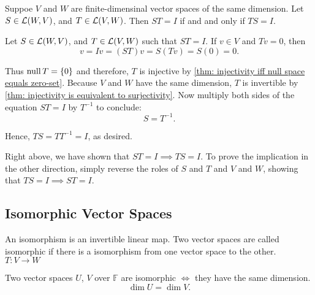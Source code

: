   \setcounter{thm}{67}
  \begin{thm} [$ST = I \iff TS=I$ on vector spaces of the same dimension]
    \label{thm: ST = I iff TS=I - on vector spaces of the same dimension}
    Suppoe $V$ and $W$ are finite-dimensinal vector spaces of the same dimension. Let $S \in \mathcal{L} (W,V)$, and $T \in \mathcal{L}(V,W)$. Then $ST = I$ if and and only if $TS = I$.
  \end{thm}
  \begin{prf}
     \Rightarrowdirection Let $S \in \mathcal{L} (W,V)$, and $T \in \mathcal{L}(V,W)$ such that $ST = I$. If $v \in V$ and $Tv = 0$, then
     \begin{equation}
       v = Iv = (ST)v = S(Tv) = S(0) = 0.
     \end{equation}

     Thus $\operatorname{null} T = \{0\}$ and therefore, $T$ is injective by \ref{thm: injectivity iff null space equals zero-set}. Because $V$ and $W$ have the same dimension, $T$ is invertible by \ref{thm: injectivity is equivalent to surjectivity}. Now multiply both sides of the equation $ST = I$ by $T^{-1}$ to conclude:
     \begin{equation}
       S = T^{-1}.
     \end{equation}

     Hence, $TS = TT^{-1} = I$, as desired.

     \Leftarrowdirection Right above, we have shown that $ST = I \implies TS=I$. To prove the implication in the other direction, simply reverse the roles of $S$ and $T$ and $V$ and $W$, showing that $TS=I \implies ST=I$.
  \end{prf}

  \subsection{Isomorphic Vector Spaces}

  \begin{thm}
    An isomorphism is an invertible linear map. Two vector spaces are called isomorphic if there is a isomorphism from one vector space to the other. $T:V\to W$
  \end{thm}

  \begin{thm}
    \label{thm: dimension shows whether vector spaces are isomorphic}
    Two \fd vector spaces $U$, $V$ over $\mathbb{F}$ are isomorphic $\iff$ they have the same dimension.
    \begin{equation}
      \dim U = \dim V.
    \end{equation}
  \end{thm}

